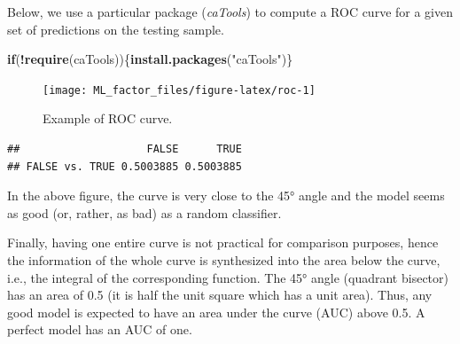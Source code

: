 \documentclass[]{krantz}
\makeatletter
\newenvironment{Shaded}{\begin{snugshade}}{\end{snugshade}}
\newcommand{\CommentTok}[1]{\textcolor[rgb]{0.37,0.37,0.37}{\textit{#1}}}
\newcommand{\ControlFlowTok}[1]{\textcolor[rgb]{0.27,0.27,0.27}{\textbf{#1}}}
\newcommand{\DataTypeTok}[1]{\textcolor[rgb]{0.27,0.27,0.27}{#1}}
\newcommand{\KeywordTok}[1]{\textcolor[rgb]{0.27,0.27,0.27}{\textbf{#1}}}
\newcommand{\NormalTok}[1]{#1}
\newcommand{\OperatorTok}[1]{\textcolor[rgb]{0.43,0.43,0.43}{\textbf{#1}}}
\newcommand{\OtherTok}[1]{\textcolor[rgb]{0.37,0.37,0.37}{#1}}
\newcommand{\StringTok}[1]{\textcolor[rgb]{0.5,0.5,0.5}{#1}}
\newenvironment{kframe}{%
\medskip{}
\setlength{\fboxsep}{.8em}
 \def\at@end@of@kframe{}%
 \ifinner\ifhmode%
  \def\at@end@of@kframe{\end{minipage}}%
  \begin{minipage}{\columnwidth}%
 \fi\fi%
 \def\FrameCommand##1{\hskip\@totalleftmargin \hskip-\fboxsep
 \colorbox{shadecolor}{##1}\hskip-\fboxsep
     \hskip-\linewidth \hskip-\@totalleftmargin \hskip\columnwidth}%
 \MakeFramed {\advance\hsize-\width
   \@totalleftmargin\z@ \linewidth\hsize
   \@setminipage}}%
 {\par\unskip\endMakeFramed%
 \at@end@of@kframe}
\renewenvironment{Shaded}{\begin{kframe}}{\end{kframe}}
\theoremstyle{definition}
\theoremstyle{definition}
\theoremstyle{definition}
\theoremstyle{remark}
\makeatother
\begin{document}
Below, we use a particular package (\emph{caTools}) to compute a ROC
curve for a given set of predictions on the testing sample.

\footnotesize

\begin{Shaded}
\begin{Highlighting}[]
\ControlFlowTok{if}\NormalTok{(}\OperatorTok{!}\KeywordTok{require}\NormalTok{(caTools))\{}\KeywordTok{install.packages}\NormalTok{(}\StringTok{"caTools"}\NormalTok{)\}}
\end{Highlighting}
\end{Shaded}

\normalsize

\footnotesize

\begin{Shaded}
\end{Shaded}

\begin{figure}[H]

{\centering \texttt{[image: ML\_factor\_files/figure-latex/roc-1]} 

}

\caption{Example of ROC curve.}\label{fig:roc}
\end{figure}

\begin{verbatim}
##                    FALSE      TRUE
## FALSE vs. TRUE 0.5003885 0.5003885
\end{verbatim}

\normalsize

In the above figure, the curve is very close to the 45° angle and the
model seems as good (or, rather, as bad) as a random classifier.

Finally, having one entire curve is not practical for comparison
purposes, hence the information of the whole curve is synthesized into
the area below the curve, i.e., the integral of the corresponding
function. The 45° angle (quadrant bisector) has an area of 0.5 (it is
half the unit square which has a unit area). Thus, any good model is
expected to have an area under the curve (AUC) above 0.5. A perfect
model has an AUC of one.
\end{document}

